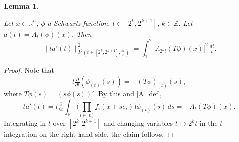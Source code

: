 \documentclass[12pt,reqno]{amsart}
\theoremstyle{plain}
\newtheorem{lemma}[theorem]{Lemma}
\numberwithin{equation}{section}
\theoremstyle{remark}
\newcommand{\uses}[1]{}
\newcommand{\usesdefs}[1]{}
\newcommand{\leanok}{}
\newcommand{\lean}[1]{}
\newcommand{\Z}{{\mathbb Z}}
\newcommand{\R}{{\mathbb R}}
\begin{document}
\begin{lemma} \label{lem:ftc_ATphi}\uses{}\usesdefs{A_def}
\lean{Auto.ftcATphi}
\leanok
Let $x\in \R^n$, $\phi$ a Schwartz function,  $t\in [2^k, 2^{k+1}]$, $k\in \Z$. Let $a(t)=A_t(\phi)(x)$. Then
\begin{equation}\label{auto:average-logarithmic-derivative-identity} \|ta'(t)\|_{L^2(t\in [2^k, 2^{k+1}],\tfrac{dt}{t})}^2 = \int_{1}^2 |A_{2^k t}(T\phi)(x)|^2\,\tfrac{dt}{t}. \end{equation}
\end{lemma}

\begin{proof}
Note that
\begin{equation}\label{shortlongftc_reduction_pf3}
t\tfrac{\partial}{\partial t}(\phi_{(t)}(s)) = -(T\phi)_{(t)}(s),
\end{equation}
where $T\phi(s) = (s \phi(s))'$.
    By this and \eqref{A_def},
\[ ta'(t) = t\tfrac{\partial}{\partial t}\int_{\mathbb{R}} \Big(\prod_{i\in [n)} f_i(x+se_i)\Big)\phi_{(t)}(s)\,ds = -A_t(T\phi)(x). \]
Integrating in $t$ over $[2^k,2^{k+1}]$ and changing variables $t \mapsto 2^k t$ in the $t$-integration on the right-hand side,
the claim follows.
\end{proof}
\end{document}
